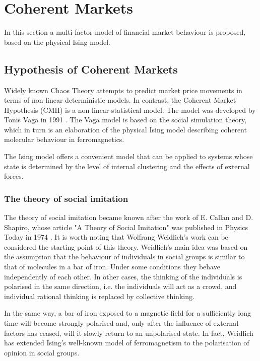 \section{Coherent Markets}

In this section a multi-factor model of financial market behaviour is proposed, based on the physical Ising model. 


 \subsection{Hypothesis of Coherent Markets}
 
Widely known Chaos Theory attempts to predict market price movements in terms of non-linear deterministic models. In contrast, the Coherent Market Hypothesis (CMH) is a non-linear statistical model. The model was developed by Tonis Vaga in 1991 \cite{vaga}. The Vaga model is based on the social simulation theory, which in turn is an elaboration of the physical Ising model describing coherent molecular behaviour in ferromagnetics.

The Ising model offers a convenient model that can be applied to systems whose state is determined by the level of internal clustering and the effects of external forces.

\subsubsection*{The theory of social imitation} The theory of social imitation became known after the work of E. Callan and D. Shapiro, whose article "A Theory of Social Imitation" was published in Physics Today in 1974 \cite{callan}. It is worth noting that Wolfrang Weidlich's work \cite{weidlich} can be considered the starting point of this theory. Weidlich's main idea was based on the assumption that the behaviour of individuals in social groups is similar to that of molecules in a bar of iron. Under some conditions they behave independently of each other. In other cases, the thinking of the individuals is polarised in the same direction, i.e. the individuals will act as a crowd, and individual rational thinking is replaced by collective thinking. 

In the same way, a bar of iron exposed to a magnetic field for a sufficiently long time will become strongly polarised and, only after the influence of external factors has ceased, will it slowly return to an unpolarised state. In fact, Weidlich has extended Ising's well-known model of ferromagnetism to the polarisation of opinion in social groups.

